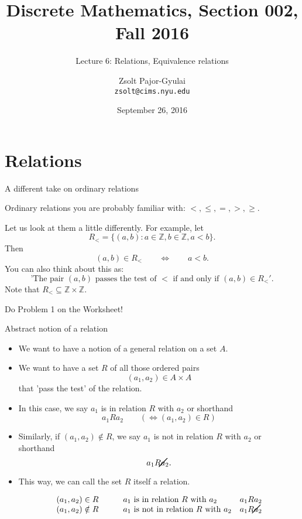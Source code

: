 \documentclass{beamer}
\title{Discrete Mathematics, Section 002, Fall 2016}
\subtitle{Lecture 6: Relations, Equivalence relations}
\date{September 26, 2016}
\author[Zsolt]{Zsolt Pajor-Gyulai \\ \texttt{zsolt@cims.nyu.edu}}
\institute[NYU] 
{
\normalsize Courant Institute of Mathematical Sciences
}
\def\bl[#1]#2{\begin{block}{#1}#2\end{block}}
\def\integers{\mathbb{Z}}
\def\itemb{\begin{itemize}}
\def\iteme{\end{itemize}}
\begin{document}
\begin{frame}
  \titlepage
\end{frame}


\section{Relations}

\begin{frame}{A different take on ordinary relations}
\bl[]{Ordinary relations you are probably familiar with: $<,\leq,=,>,\geq$.}

Let us look at them a little differently. For example, let
\[
R_<=\{(a,b): a\in\integers, b\in\integers, a<b\}.
\]
Then 
\[
(a,b)\in R_<\qquad\Leftrightarrow\qquad a<b.
\]
You can also think about this as:
\[
\textrm{'The pair $(a,b)$ passes the test of $<$  if and only if $(a,b)\in R_<$}'.
\]
Note that $R_<\subseteq\integers\times\integers$.

\begin{center}
Do Problem 1 on the Worksheet!
\end{center}
\end{frame}

\begin{frame}{Abstract notion of a relation}
\itemb
\item We want to have a notion of a general relation on a set $A$. 
\item We want to have a set $R$ of all those ordered pairs 
\[
(a_1,a_2)\in A\times A
\]
that 'pass the test' of the relation.
\item In this case, we say $a_1$ is in relation $R$ with $a_2$ or shorthand
\[
a_1 R a_2\qquad (\Leftrightarrow (a_1,a_2)\in R)
\]
\item Similarly, if $(a_1,a_2)\notin R$, we say $a_1$ is not in relation $R$ with $a_2$ or shorthand
\[
a_1\cancel{R}a_2.
\]
\item This way, we can call the set $R$ itself a relation.
\bl[]{\vspace{-0.4cm}
\[
\begin{array}{clr}
(a_1,a_2)\in R &\qquad \textrm{$a_1$  is in relation $R$ with $a_2$}& a_1 R a_2\\
(a_1,a_2)\notin R &\qquad\textrm{$a_1$ is not in relation $R$ with $a_2$}& a_1\cancel{R} a_2
\end{array}
\]}
\iteme
\end{frame}
\end{document}
